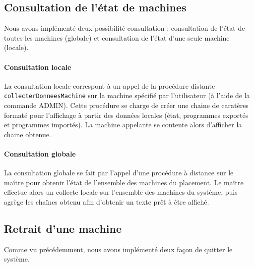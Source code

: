   \subsection{Consultation de l'état de machines}
    Nous avons implémenté deux possibilité consultation : consultation 
    de l'état de toutes les machines (globale) et consultation de l'état
    d'une seule machine (locale).
    
    \paragraph{Consultation locale}
    La consultation locale correspont à un appel de la procédure distante 
    \verb"collecterDonneesMachine" sur la machine spécifié par 
    l'utilisateur (à l'aide de la commande ADMIN). Cette procédure se 
    charge de créer une chaine de caratères formaté pour l'affichage à
    partir des données locales (état, programmes exportés et programmes
    importés). La machine appelante se contente alors d'afficher la 
    chaine obtenue.
     
    
    \paragraph{Consultation globale}
    La consultation globale se fait par l'appel d'une procédure à 
    distance sur le maître pour obtenir l'état de l'ensemble des 
    machines du placement. Le maître effectue alors un collecte locale 
    sur l'ensemble des machines du système, puis agrège les chaînes 
    obtenu afin d'obtenir un texte prêt à être affiché.
    
    
    
    \subsection{Retrait d'une machine}
    Comme vu précédemment, nous avons implémenté deux façon de quitter 
    le système. 
    
